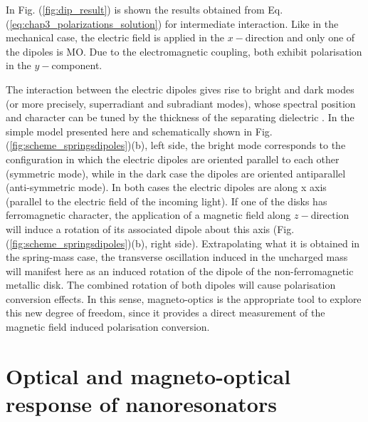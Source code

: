 In Fig. (\ref{fig:dip_result}) is shown the results obtained from Eq. (\ref{eq:chap3_polarizations_solution}) for intermediate interaction. Like in the mechanical case, the electric field is applied in the $x-$direction and only one of the dipoles is MO. Due to the electromagnetic coupling, both exhibit polarisation in the $y-$component.

The interaction between the electric dipoles gives rise to bright and dark modes (or more precisely, superradiant and subradiant modes), whose spectral position and character can be tuned by the thickness of the separating dielectric \cite{dmitriev2007gold, pakizeh2008structural, ekinci2008electric}. In the simple model presented here and schematically shown in Fig. (\ref{fig:scheme_springsdipoles})(b), left side, the bright mode corresponds to the configuration in which the electric dipoles are oriented parallel to each other (symmetric mode), while in the dark case the dipoles are oriented antiparallel (anti-symmetric mode). In both cases the electric dipoles are along x axis (parallel to the electric field of the incoming light). If one of the disks has ferromagnetic character, the application of a magnetic field along $z-$direction will induce a rotation of its associated dipole about this axis (Fig. (\ref{fig:scheme_springsdipoles})(b), right side). Extrapolating what it is obtained in the spring-mass case, the transverse oscillation induced in the uncharged mass will manifest here as an induced rotation of the dipole of the non-ferromagnetic metallic disk. The combined rotation of both dipoles will cause polarisation conversion effects. In this sense, magneto-optics is the appropriate tool to explore this new degree of freedom, since it provides a direct measurement of the magnetic field induced polarisation conversion.

\section{Optical and magneto-optical response of nanoresonators \label{sec:chap3_nanoresonators}} 

